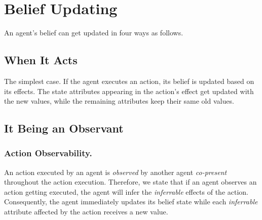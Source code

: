 \documentclass[letterpaper]{article} %
\begin{document}
\section{Belief Updating}
An agent's belief can get updated in four ways as follows. 

\subsection{When It Acts}
The simplest case. If the agent executes an action, its belief is updated based on its effects. The state attributes appearing in the action's effect get updated with the new values, while the remaining attributes keep their same old values.

\subsection{It Being an Observant}

\subsubsection{Action Observability.}
An action executed by an agent is \textit{observed} by another agent \emph{co-present} throughout the action execution. Therefore, we state that if an agent observes an action getting executed, the agent will infer the \textit{inferrable} effects of the action.
Consequently, the agent immediately updates its belief state while each \textit{inferrable} attribute affected by the action receives a new value.  
\end{document}
